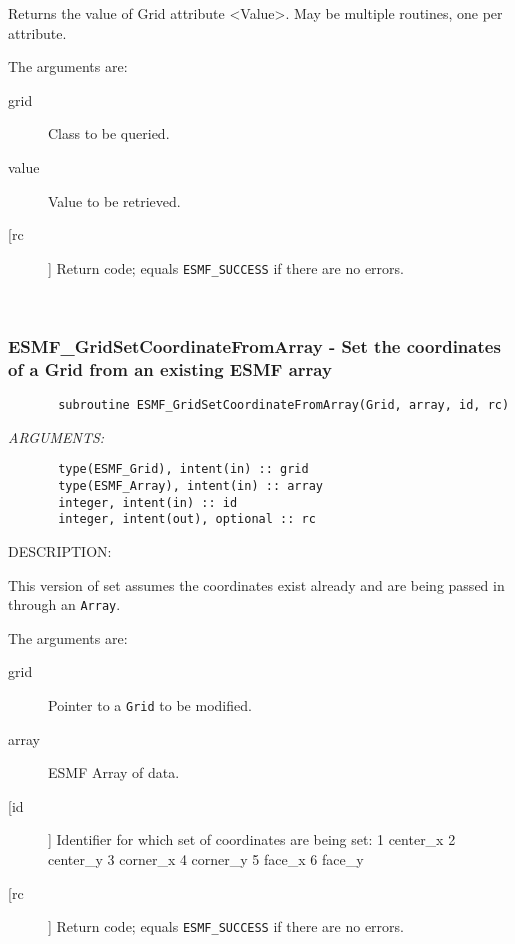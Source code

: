 {       Returns the value of Grid attribute <Value>.
       May be multiple routines, one per attribute.
  
       The arguments are:
       \begin{description}
       \item[grid] 
            Class to be queried.
       \item[value]
            Value to be retrieved.         
       \item[[rc]] 
            Return code; equals {\tt ESMF\_SUCCESS} if there are no errors.
       \end{description}
   
 
\mbox{}\hrulefill\ 
 
\subsubsection{ESMF\_GridSetCoordinateFromArray - Set the coordinates of a Grid from an existing ESMF array}


 
\begin{verbatim}       subroutine ESMF_GridSetCoordinateFromArray(Grid, array, id, rc)\end{verbatim}{\em ARGUMENTS:}
\begin{verbatim}       type(ESMF_Grid), intent(in) :: grid
       type(ESMF_Array), intent(in) :: array
       integer, intent(in) :: id
       integer, intent(out), optional :: rc\end{verbatim}
{\sf DESCRIPTION:\\ }


       This version of set assumes the coordinates exist already and are being
       passed in through an {\tt Array}.
  
       The arguments are:
       \begin{description}
       \item[grid] 
            Pointer to a {\tt Grid} to be modified.
       \item[array]
            ESMF Array of data.         
       \item[[id]]
            Identifier for which set of coordinates are being set:
               1  center\_x
               2  center\_y
               3  corner\_x
               4  corner\_y
               5  face\_x
               6  face\_y 
       \item[[rc]] 
            Return code; equals {\tt ESMF\_SUCCESS} if there are no errors.
       \end{description}
   
}
